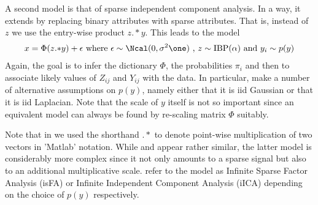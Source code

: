 \documentclass[twoside,11pt]{article}
\begin{document}
A second model is that of sparse independent component analysis. In a
way, it extends  by replacing binary attributes with
sparse attributes. That is, instead of $z$ we use the entry-wise
product $z \mathrm{.*} y$. This leads to the model
\begin{align}
  \label{eq:linzy}
  x = \Phi (z \mathrm{.*} y) + \epsilon
  \text{ where } \epsilon \sim \Ncal(0, \sigma^2 \one)
  \text{ , } z \sim \mathrm{IBP}(\alpha)
  \text{ and } y_i \sim p(y)
\end{align}
Again, the goal is to infer the dictionary $\Phi$, the probabilities $\pi_i$ and then to
associate likely values of $Z_{ij}$ and $Y_{ij}$ with the data. In
particular, \cite{KnoGha07} make a number of alternative assumptions
on $p(y)$, namely either that it is iid Gaussian or that it is iid
Laplacian. Note that the scale of $y$ itself is not so important since
an equivalent model can always be found by re-scaling matrix $\Phi$ suitably. 

Note that in  we used the shorthand $\mathrm{.*}$ to
denote point-wise multiplication of two vectors in 'Matlab'
notation. While  and  appear rather
similar, the latter model is considerably more complex since it not
only amounts to a sparse signal but also to an additional
multiplicative scale. \cite{KnoGha07} refer to the model as Infinite
Sparse Factor Analysis (isFA) or Infinite Independent Component
Analysis (iICA) depending on the choice of $p(y)$ respectively.
\end{document}
